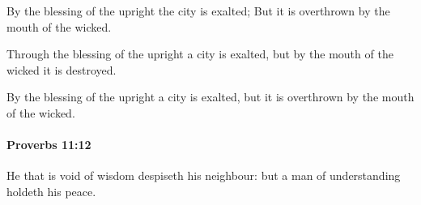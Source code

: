 			\begin{versebox}
					\item[BHS] 
					\item[ASV] By the blessing of the upright the city is exalted; But it is overthrown by the mouth of the wicked.
					\item[NIV] Through the blessing of the upright a city is exalted, but by the mouth of the wicked it is destroyed.
					\item[NRSV] By the blessing of the upright a city is exalted, but it is overthrown by the mouth of the wicked.
			\end{versebox}

		\paragraph{Proverbs 11:12} %
			\label{PROVERBS-11-12}

			He that is void of wisdom despiseth his neighbour: but a man of understanding holdeth his peace.

